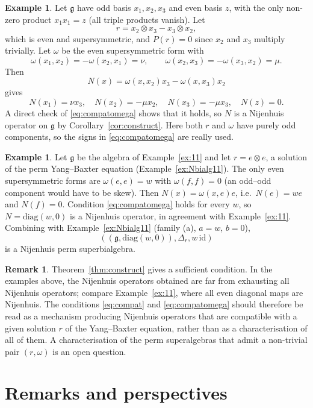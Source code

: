 \documentclass[11pt]{article}
\theoremstyle{definition}
\newtheorem{example}[theorem]{Example}
\newtheorem{remark}[theorem]{Remark}
\newcommand{\g}{\mathfrak{g}}
\newcommand{\id}{\mathrm{id}}
\begin{document}
\begin{example}\label{ex:odd}
Let $\g$ have odd basis $x_1,x_2,x_3$ and even basis $z$, with the only non-zero product $x_1x_1=z$ (all triple products vanish). Let
\[
r=x_2\otimes x_3-x_3\otimes x_2,
\]
which is even and supersymmetric, and $P(r)=0$ since $x_2$ and $x_3$ multiply trivially. Let $\omega$ be the even supersymmetric form with
\[
\omega(x_1,x_2)=-\omega(x_2,x_1)=\nu,
\qquad
\omega(x_2,x_3)=-\omega(x_3,x_2)=\mu.
\]
Then
\[
N(x)=\omega(x,x_2)x_3-\omega(x,x_3)x_2
\]
gives
\[
N(x_1)=\nu x_3,\quad
N(x_2)=-\mu x_2,\quad
N(x_3)=-\mu x_3,\quad
N(z)=0.
\]
A direct check of \eqref{eq:compatomega} shows that it holds, so $N$ is a Nijenhuis operator on $\g$ by Corollary~\ref{cor:construct}. Here both $r$ and $\omega$ have purely odd components, so the signs in \eqref{eq:compatomega} are really used.
\end{example}

\begin{example}\label{ex:ext11}
Let $\g$ be the algebra of Example~\ref{ex:11} and let $r=e\otimes e$, a solution of the perm Yang--Baxter equation (Example~\ref{ex:Nbialg11}). The only even supersymmetric forms are $\omega(e,e)=w$ with $\omega(f,f)=0$ (an odd--odd component would have to be skew). Then $N(x)=\omega(x,e)e$, i.e.\ $N(e)=we$ and $N(f)=0$. Condition \eqref{eq:compatomega} holds for every $w$, so $N=\mathrm{diag}(w,0)$ is a Nijenhuis operator, in agreement with Example~\ref{ex:11}. Combining with Example~\ref{ex:Nbialg11} (family (a), $a=w$, $b=0$),
\[
((\g,\mathrm{diag}(w,0)),\Delta_r,w\,\id)
\]
is a Nijenhuis perm superbialgebra.
\end{example}

\begin{remark}\label{rem:converse}
Theorem~\ref{thm:construct} gives a sufficient condition. In the examples above, the Nijenhuis operators obtained are far from exhausting all Nijenhuis operators; compare Example~\ref{ex:11}, where all even diagonal maps are Nijenhuis. The conditions \eqref{eq:compat} and \eqref{eq:compatomega} should therefore be read as a mechanism producing Nijenhuis operators that are compatible with a given solution $r$ of the Yang--Baxter equation, rather than as a characterisation of all of them. A characterisation of the perm superalgebras that admit a non-trivial pair $(r,\omega)$ is an open question.
\end{remark}

\section{Remarks and perspectives}\label{sec:remarks}
\end{document}
